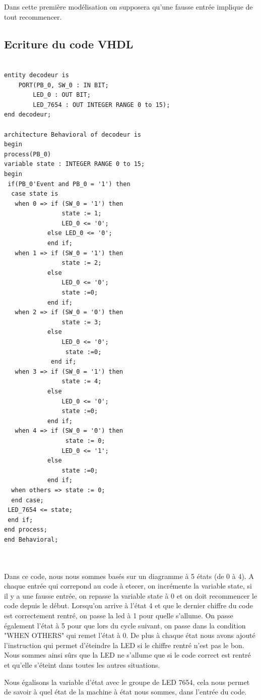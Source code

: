 \documentclass[11pt]{report}
\begin{document}
Dans cette première modélisation on supposera qu'une fausse entrée implique de tout recommencer. 

\subsection{Ecriture du code VHDL}

\begin{lstlisting}

entity decodeur is
	PORT(PB_0, SW_0 : IN BIT;
		LED_0 : OUT BIT;
		LED_7654 : OUT INTEGER RANGE 0 to 15);
end decodeur;

architecture Behavioral of decodeur is
begin
process(PB_0)
variable state : INTEGER RANGE 0 to 15;
begin
 if(PB_0'Event and PB_0 = '1') then
  case state is
   when 0 => if (SW_0 = '1') then 
      			state := 1; 
      			LED_0 <= '0'; 
			else LED_0 <= '0';
       		end if;
   when 1 => if (SW_0 = '1') then 
      			state := 2; 
       		else
       			LED_0 <= '0'; 
      			state :=0; 
      		end if;
   when 2 => if (SW_0 = '0') then 
      			state := 3; 
			else 
       			LED_0 <= '0';
        		 state :=0; 
      		 end if;
   when 3 => if (SW_0 = '1') then 
    			state := 4; 
       		else
         		LED_0 <= '0'; 
         		state :=0; 
       		end if;
   when 4 => if (SW_0 = '0') then 
     			 state := 0; 
				LED_0 <= '1';
			else 
     			state :=0;
     		end if;
  when others => state := 0;
  end case;
 LED_7654 <= state;
 end if;
end process;
end Behavioral;



\end{lstlisting}

Dans ce code, nous nous sommes basés sur un diagramme à 5 états (de 0 à 4). A chaque entrée qui correpond au code à etecer, on incrémente la variable state, si il y a une fausse entrée, on repasse la variable state à 0 et on doit recommencer le code depuis le début. Lorsqu'on arrive à l'état 4 et que le dernier chiffre du code est correctement rentré, on passe la led à 1 pour quelle s'allume. On passe également l'état à 5 pour que lors du cycle suivant, on passe dans la condition "WHEN OTHERS" qui remet l'état à 0. De plus à chaque état nous avons ajouté l'instruction qui permet d'éteindre la LED si le chiffre rentré n'est pas le bon. Nous sommes ainsi sûrs que la LED ne s'allume que si le code correct est rentré et qu'elle s'éteint dans toutes les autres situations. 

Nous égalisons la variable d'état avec le groupe de LED 7654, cela nous permet de savoir à quel état de la machine à état nous sommes, dans l'entrée du code. 
\end{document}
